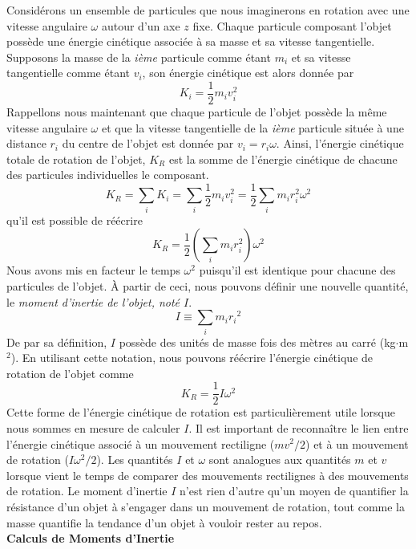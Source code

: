 \documentclass[titlepage,oneside,a4paper,11pt]{book} %
\begin{document}
Considérons un ensemble de particules que nous imaginerons en rotation avec une vitesse angulaire $\omega$ autour d'un axe $z$ fixe. Chaque particule composant l'objet possède une énergie cinétique associée à sa masse et sa vitesse tangentielle. Supposons la masse de la \emph{ième} particule comme étant $m_i$ et sa vitesse tangentielle comme étant $v_i$, son énergie cinétique est alors donnée par 
\begin{equation*}
K_i = \frac{1}{2}m_iv_i^2
\end{equation*}
Rappellons nous maintenant que chaque particule de l'objet possède la même vitesse angulaire $\omega$ et que la vitesse tangentielle de la \emph{ième} particule située à une distance $r_i$ du centre de l'objet est donnée par $v_i=r_i\omega$. Ainsi, l'énergie cinétique totale de rotation de l'objet, $K_R$ est la somme de l'énergie cinétique de chacune des particules individuelles le composant.
\begin{equation*}
K_{R}=\sum_{i} K_{i}=\sum_{i} \frac{1}{2} m_{i} v_{i}^{2}=\frac{1}{2} \sum_{i} m_{i} r_{i}^{2} \omega^{2}
\end{equation*}
qu'il est possible de réécrire
\begin{equation}
K_{R}=\frac{1}{2}\left(\sum_{i} m_{i} r_{i}^{2}\right) \omega^{2}
\end{equation}
Nous avons mis en facteur le temps $\omega^2$ puisqu'il est identique pour chacune des particules de l'objet. À partir de ceci, nous pouvons définir une nouvelle quantité, le \emph{moment d'inertie de l'objet, noté $I$}.
\begin{equation}
I \equiv \sum_{i} m_{i} r_{i}{ }^{2}
\label{eq:inertia}
\end{equation}
De par sa définition, $I$ possède des unités de masse fois des mètres au carré (kg$\cdot$m$^2$). En utilisant cette notation, nous pouvons réécrire l'énergie cinétique de rotation de l'objet comme
\begin{equation}
K_R = \frac{1}{2}I\omega^2
\end{equation}
Cette forme de l'énergie cinétique de rotation est particulièrement utile lorsque nous sommes en mesure de calculer $I$. Il est important de reconnaître le lien entre l'énergie cinétique associé à un mouvement rectiligne ($mv^2/2$) et à un mouvement de rotation ($I\omega^2/2$). Les quantités $I$ et $\omega$ sont analogues aux quantités $m$ et $v$ lorsque vient le temps de comparer des mouvements rectilignes à des mouvements de rotation. Le moment d'inertie $I$ n'est rien d'autre qu'un moyen de quantifier la résistance d'un objet à s'engager dans un mouvement de rotation, tout comme la masse quantifie la tendance d'un objet à vouloir rester au repos.\\
\newpage
{\large \textbf{Calculs de Moments d'Inertie}}\\
\end{document}
